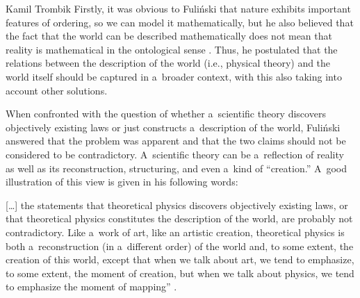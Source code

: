 \begin{artengenv}{Kamil Trombik}
Firstly, it was obvious to Fuliński that nature exhibits important features of ordering, so we can model it mathematically, but he also believed that the fact that the world can be described mathematically does not mean that reality is mathematical in the ontological sense 
\parencites[][]{janik_glos_1988}[][]{janik_glos_1990}[][]{fulinski_o_1993}. %
 Thus, he postulated that the relations between the description of the world (i.e., physical theory) and the world itself should be captured in a~broader context, with this also taking into account other solutions.



When confronted with the question of whether a~scientific theory discovers objectively existing laws or just constructs a~description of the world, Fuliński answered that the problem was apparent and that the two claims should not be considered to be contradictory. A~scientific theory can be a~reflection of reality as well as its reconstruction, structuring, and even a~kind of ``creation.'' A~good illustration of this view is given in his following words:



[…] the statements that theoretical physics discovers objectively existing laws, or that theoretical physics constitutes the description of the world, are probably not contradictory. Like a~work of art, like an artistic creation, theoretical physics is both a~reconstruction (in a~different order) of the world and, to some extent, the creation of this world, except that when we talk about art, we tend to emphasize, to some extent, the moment of creation, but when we talk about physics, we tend to emphasize the moment of mapping''
\parencite[][p.221]{janik_o_1988}.%





\end{artengenv}
